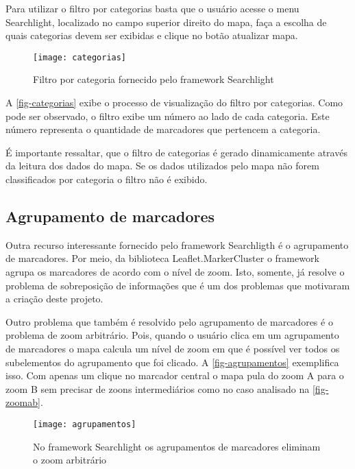 Para utilizar o filtro por categorias basta que o usuário acesse o menu Searchlight, localizado no campo superior direito do mapa, faça a escolha de quais categorias devem ser exibidas e clique no botão atualizar mapa. 

\begin{figure}[htb]
	\caption{\label{fig-categorias}Filtro por categoria fornecido pelo framework Searchlight}
	\begin{center}
	    \texttt{[image: categorias]}
	\end{center}
\end{figure}

A \autoref{fig-categorias} exibe o processo de visualização do filtro por categorias.
Como pode ser observado, o filtro  exibe um número ao lado de cada categoria. Este número representa o quantidade de marcadores que pertencem a categoria.

É importante ressaltar, que o filtro de categorias é gerado dinamicamente através da leitura dos dados do mapa. Se os dados utilizados pelo mapa não forem classificados por categoria o filtro não é exibido.

\subsection{Agrupamento de marcadores}	
Outra recurso interessante fornecido pelo framework Searchligth é o agrupamento de marcadores. Por meio, da biblioteca Leaflet.MarkerCluster o framework agrupa os marcadores de acordo com o nível de zoom. Isto, somente, já resolve o problema de sobreposição de informações que é um dos problemas que motivaram a criação deste projeto. 

Outro problema que também é resolvido pelo agrupamento de marcadores é o problema de zoom arbitrário. Pois, quando o usuário clica em um agrupamento de marcadores o mapa calcula um nível de zoom em que é possível ver todos os subelementos do agrupamento que foi clicado. A \autoref{fig-agrupamentos} exemplifica isso. Com apenas um clique no marcador central o mapa pula do zoom A para o zoom B sem precisar de zoons intermediários como no caso analisado na \autoref{fig-zoomab}.


\begin{figure}[htb]
	\caption{\label{fig-agrupamentos}No framework Searchlight os agrupamentos de marcadores eliminam o zoom arbitrário}
	\begin{center}
	    \texttt{[image: agrupamentos]}
	\end{center}
\end{figure}


